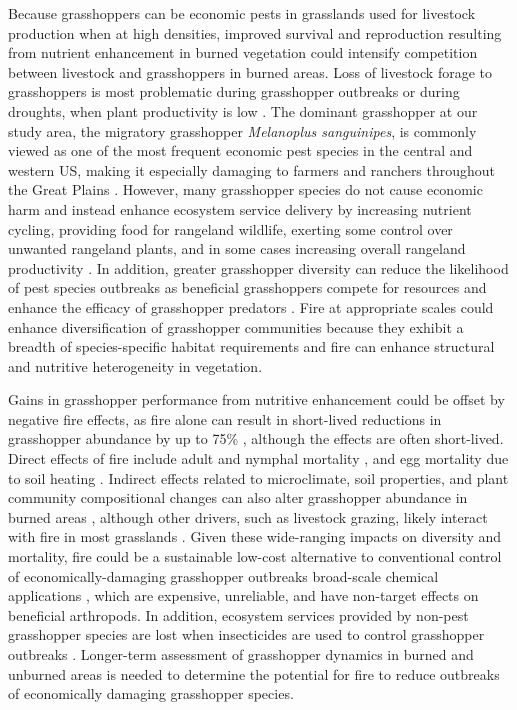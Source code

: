 \documentclass[referee, 
	            sn-basic]
           {sn-jnl}
\begin{document}
\begin{linenumbers}
Because grasshoppers can be economic pests in grasslands used for livestock production when at high densities, improved survival and reproduction resulting from nutrient enhancement in burned vegetation \citep{branson2003} could intensify competition between livestock and grasshoppers in burned areas. Loss of livestock forage to grasshoppers is most problematic during grasshopper outbreaks or during droughts, when plant productivity is low \citep{belovsky1995, joern2000, branson2014}. 
The dominant grasshopper at our study area, the migratory grasshopper \emph{Melanoplus sanguinipes}, is commonly viewed as one of the most frequent economic pest species in the central and western US, making it especially damaging to farmers and ranchers throughout the Great Plains \citep{onsager2000a, olfert2021}. 
However, many grasshopper species do not cause economic harm and instead enhance ecosystem service delivery by increasing nutrient cycling, providing food for rangeland wildlife, exerting some control over unwanted rangeland plants, and in some cases increasing overall rangeland productivity \citep{branson2006}. In addition, greater grasshopper diversity can reduce the likelihood of pest species outbreaks as beneficial grasshoppers compete for resources and enhance the efficacy of grasshopper predators \citep{branson2006}. Fire at appropriate scales could enhance diversification of grasshopper communities because they exhibit a breadth of species-specific habitat requirements and fire can enhance structural and nutritive heterogeneity in vegetation. 

Gains in grasshopper performance from nutritive enhancement could be offset by negative fire effects, as fire alone can result in short-lived reductions in grasshopper abundance by up to 75\% \citep{branson2016}, although the effects are often short-lived. 
Direct effects of fire include adult and nymphal mortality \citep{bock1991}, and egg mortality due to soil heating \citep{branson2013, branson2016, vermeire2004}. 
Indirect effects related to microclimate, soil properties, and plant community compositional changes can also alter grasshopper abundance in burned areas \citep{vanwingerden1991,schirmel2011, evans1983,matenaar2014, meyer2002}, although other drivers, such as livestock grazing, likely interact with fire in most grasslands \citep{mcgranahan2021,fuhlendorf2009,joern2005}. Given these wide-ranging impacts on diversity and mortality, fire could be a sustainable low-cost alternative to conventional control of economically-damaging grasshopper outbreaks \textemdash broad-scale chemical applications \citep{branson2006}, which are expensive, unreliable, and have non-target effects on beneficial arthropods. In addition, ecosystem services provided by non-pest grasshopper species are lost when insecticides are used to control grasshopper outbreaks \citep{joern2000}. Longer-term assessment of grasshopper dynamics in burned and unburned areas is needed to determine the potential for fire to reduce outbreaks of economically damaging grasshopper species.  


\end{linenumbers}
\end{document}
